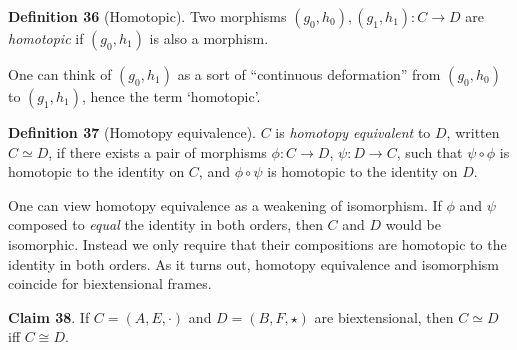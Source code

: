 \documentclass{article}
\begin{document}
\bigskip
\noindent \textbf{Definition 36} (Homotopic).
Two morphisms $(g_0, h_0), (g_1, h_1) : C \to D$ are \emph{homotopic} if $(g_0, h_1)$ is also a morphism.

\bigskip
\noindent One can think of $(g_0, h_1)$ as a sort of ``continuous deformation'' from $(g_0, h_0)$ to $(g_1, h_1)$, hence the term `homotopic'.

\bigskip
\noindent \textbf{Definition 37} (Homotopy equivalence).
$C$ is \emph{homotopy equivalent} to $D$, written $C \simeq D$, if there exists a pair of morphisms $\phi : C \to D$, $\psi : D \to C$, such that $\psi \circ \phi$ is homotopic to the identity on $C$, and $\phi \circ \psi$ is homotopic to the identity on $D$.

One can view homotopy equivalence as a weakening of isomorphism.
If $\phi$ and $\psi$ composed to \emph{equal} the identity in both orders, then $C$ and $D$ would be isomorphic.
Instead we only require that their compositions are homotopic to the identity in both orders.
As it turns out, homotopy equivalence and isomorphism coincide for biextensional frames.

\bigskip
\noindent \textbf{Claim 38}.
If $C = (A, E, \cdot)$ and $D = (B, F, \star)$ are biextensional, then $C \simeq D$ iff $C \cong D$.
\end{document}
